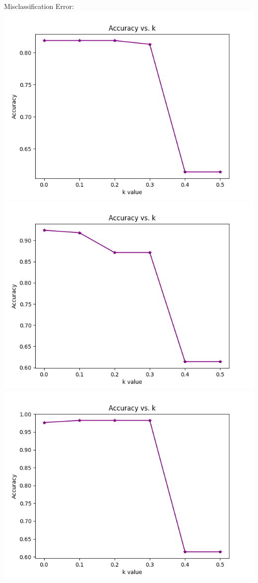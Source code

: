 \documentclass[12pt, letterpaper]{article}
\begin{document}
\begin{enumerate}[label=\Roman*.]
\begin{enumerate}[label=\arabic*.]
		Misclassification Error: \\
		\includegraphics[scale=0.5]{../images/accuracy_validation_DT_Threshold_error_2.png} 
		\includegraphics[scale=0.5]{../images/accuracy_validation_DT_Threshold_error_4.png} 
		\includegraphics[scale=0.5]{../images/accuracy_validation_DT_Threshold_error_6.png} \\
		

\end{enumerate}
\end{enumerate}
\end{document}
